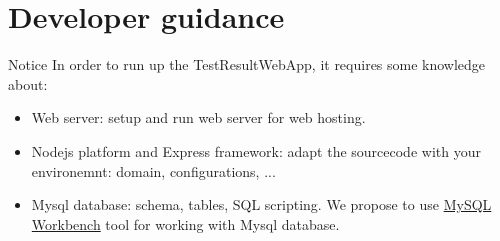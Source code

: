 \hypertarget{developer-guidance}{%
\section{Developer guidance}\label{developer-guidance}}

\begin{boxhint}{Notice}
In order to run up the TestResultWebApp, it requires some knowledge about:
\begin{itemize}
   \item Web server: setup and run web server for web hosting.
   \item Nodejs platform and Express framework: adapt the sourcecode with your
         environemnt: domain, configurations, ...
   \item Mysql database: schema, tables, SQL scripting. We propose to use 
         \href{https://dev.mysql.com/doc/workbench/en/}{MySQL Workbench} tool
         for working with Mysql database.
\end{itemize}
\end{boxhint}

